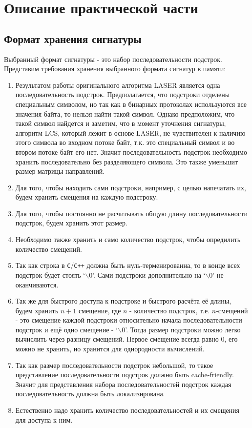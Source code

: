 \section{Описание практической части}
\label{sec:Chapter4} 

\subsection{Формат хранения сигнатуры}

Выбранный формат сигнатуры - это набор последовательности подстрок. Представим требования хранения выбранного формата сигнатур в памяти:

\begin{enumerate}
    \item Результатом работы оригинального алгоритма LASER является одна последовательность подстрок.
    Предполагается, что подстроки отделены специальным символом, но так как в бинарных протоколах используются все значения байта, то
    нельзя найти такой символ. Однако предположим, что такой символ найдется и заметим, что в момент уточнения сигнатуры, алгоритм LCS, который лежит в основе LASER,
    не чувствителен к наличию этого символа во входном потоке байт, т.к. это специальный символ и во втором потоке байт его нет.
    Значит последовательность подстрок необходимо хранить последовательно без разделяющего символа. Это также уменьшит размер матрицы направлений.
    \item Для того, чтобы находить сами подстроки, например, с целью напечатать их, будем хранить смещения на каждую подстроку.
    \item Для того, чтобы постоянно не расчитывать общую длину последовательности подстрок, будем хранить этот размер.
    \item Необходимо также хранить и само количество подстрок, чтобы опредилить количество смещений.
    \item Так как строка в \verb!C!/\verb!C++! должна быть нуль-терменированна, то в конце всех подстрок будет стоять  `$\backslash 0$'.
    Сами подстроки дополнительно на `$\backslash 0$' не оканчиваются.
    \item Так же для быстрого доступа к подстроке и быстрого расчёта её длины, будем хранить $n + 1$ смещение, где $n$ - количество подстрок,
    т.е. $n$-смещений - это смещение каждой подстроки относительно начала последовательности подстрок и ещё одно смещение - `$\backslash 0$'.
    Тогда размер подстроки можно легко вычислить через разницу смещений. Первое смещение всегда равно 0, его можно не хранить, но хранится для однородности вычислений.
    \item Так как размер последовательности подстрок небольшой, то такое представление последовательности подстрок должно быть cache-friendly.
    Значит для представления набора последовательностей подстрок каждая последовательность должна быть локализирована.
    \item Естественно надо хранить количество последовательностей и их смещения для доступа к ним.
\end{enumerate}



